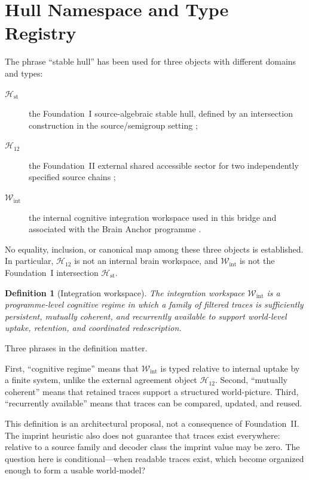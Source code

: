 \documentclass[12pt,a4paper]{article}
\newtheorem{definition}{Definition}[section]
\begin{document}
\section{Hull Namespace and Type Registry}

The phrase ``stable hull'' has been used for three objects with different
domains and types:

\begin{description}
\item[\(\mathcal H_{\mathrm{st}}\)] the Foundation~I
source-algebraic stable hull, defined by an intersection construction in
the source/semigroup setting \cite{FoundationI};
\item[\(\mathcal H_{12}\)] the Foundation~II external shared accessible
sector for two independently specified source chains
\cite{FoundationII};
\item[\(\mathcal W_{\mathrm{int}}\)] the internal cognitive integration
workspace used in this bridge and associated with the Brain Anchor
programme \cite{BrainAnchor}.
\end{description}

No equality, inclusion, or canonical map among these three objects is
established. In particular, \(\mathcal H_{12}\) is not an internal brain
workspace, and \(\mathcal W_{\mathrm{int}}\) is not the Foundation~I
intersection \(\mathcal H_{\mathrm{st}}\).

\begin{definition}[Integration workspace]
The \emph{integration workspace} \(\mathcal W_{\mathrm{int}}\) is a
programme-level cognitive regime in which a family of filtered traces is
sufficiently persistent, mutually coherent, and recurrently available
to support world-level uptake, retention, and coordinated redescription.
\end{definition}

Three phrases in the definition matter.

First, ``cognitive regime'' means that \(\mathcal W_{\mathrm{int}}\) is
typed relative to internal uptake by a finite system, unlike the external
agreement object \(\mathcal H_{12}\). Second, ``mutually coherent'' means
that retained traces support a structured world-picture. Third,
``recurrently available'' means that traces can be compared, updated,
and reused.

This definition is an architectural proposal, not a consequence of
Foundation~II. The imprint heuristic also does not guarantee that traces
exist everywhere: relative to a source family and decoder class the
imprint value may be zero. The question here is conditional---when
readable traces exist, which become organized enough to form a usable
world-model?
\end{document}
